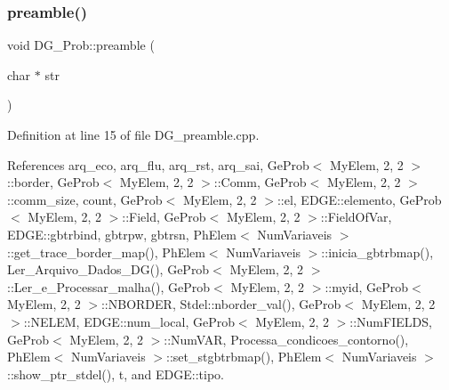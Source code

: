 \mbox{\label{classDG__Prob_a43fca83a2395515cd1c0c3083463532d}} 
\subsubsection{\texorpdfstring{preamble()}{preamble()}}
{\footnotesize\ttfamily void D\+G\+\_\+\+Prob\+::preamble (\begin{DoxyParamCaption}\item[{char $\ast$}]{str }\end{DoxyParamCaption})}



Definition at line 15 of file D\+G\+\_\+preamble.\+cpp.



References arq\+\_\+eco, arq\+\_\+flu, arq\+\_\+rst, arq\+\_\+sai, Ge\+Prob$<$ My\+Elem, 2, 2 $>$\+::border, Ge\+Prob$<$ My\+Elem, 2, 2 $>$\+::\+Comm, Ge\+Prob$<$ My\+Elem, 2, 2 $>$\+::comm\+\_\+size, count, Ge\+Prob$<$ My\+Elem, 2, 2 $>$\+::el, E\+D\+G\+E\+::elemento, Ge\+Prob$<$ My\+Elem, 2, 2 $>$\+::\+Field, Ge\+Prob$<$ My\+Elem, 2, 2 $>$\+::\+Field\+Of\+Var, E\+D\+G\+E\+::gbtrbind, gbtrpw, gbtrsn, Ph\+Elem$<$ Num\+Variaveis $>$\+::get\+\_\+trace\+\_\+border\+\_\+map(), Ph\+Elem$<$ Num\+Variaveis $>$\+::inicia\+\_\+gbtrbmap(), Ler\+\_\+\+Arquivo\+\_\+\+Dados\+\_\+\+D\+G(), Ge\+Prob$<$ My\+Elem, 2, 2 $>$\+::\+Ler\+\_\+e\+\_\+\+Processar\+\_\+malha(), Ge\+Prob$<$ My\+Elem, 2, 2 $>$\+::myid, Ge\+Prob$<$ My\+Elem, 2, 2 $>$\+::\+N\+B\+O\+R\+D\+ER, Stdel\+::nborder\+\_\+val(), Ge\+Prob$<$ My\+Elem, 2, 2 $>$\+::\+N\+E\+L\+EM, E\+D\+G\+E\+::num\+\_\+local, Ge\+Prob$<$ My\+Elem, 2, 2 $>$\+::\+Num\+F\+I\+E\+L\+DS, Ge\+Prob$<$ My\+Elem, 2, 2 $>$\+::\+Num\+V\+AR, Processa\+\_\+condicoes\+\_\+contorno(), Ph\+Elem$<$ Num\+Variaveis $>$\+::set\+\_\+stgbtrbmap(), Ph\+Elem$<$ Num\+Variaveis $>$\+::show\+\_\+ptr\+\_\+stdel(), t, and E\+D\+G\+E\+::tipo.

